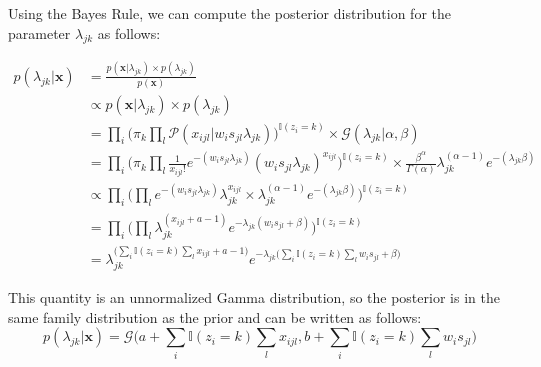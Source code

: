 Using the Bayes Rule, we can compute the posterior distribution for the parameter $\lambda_{jk}$ as follows:

\begin{equation} \label{posterior-poisson-bayes-rule-app}
  \begin{split}
  	p(\lambda_{jk} | \mathbf{x}) & = \frac{p(\mathbf{x}| \lambda_{jk}) \times p(\lambda_{jk})}{p(\mathbf{x})} \\
  		& \propto p(\mathbf{x}| \lambda_{jk}) \times p(\lambda_{jk}) \\
  		& = \prod_{i} \bigg(\pi_{k} \prod_{l} \mathcal{P}(x_{ijl} | w_{i}s_{jl} \lambda_{jk})\bigg)^{\mathbb{I}(z_{i}=k)} \times \mathcal{G}(\lambda_{jk}|\alpha, \beta) \\
  		& = \prod_{i} \bigg(\pi_{k} \prod_{l} \frac{1}{x_{ijl}!} e^{-(w_{i}s_{jl}\lambda_{jk})} (w_{i}s_{jl}\lambda_{jk})^{x_{ijl}}\bigg)^{\mathbb{I}(z_{i}=k)} \times \frac{\beta^{\alpha}}{\Gamma(\alpha)}\lambda_{jk}^{(\alpha-1)} e^{-(\lambda_{jk}\beta)} \\
		& \propto \prod_{i} \bigg(\prod_{l} e^{-(w_{i}s_{jl}\lambda_{jk})} \lambda_{jk}^{x_{ijl}} \times \lambda_{jk}^{(\alpha-1)} e^{-(\lambda_{jk}\beta)}\bigg)^{\mathbb{I}(z_{i}=k)} \\
		& = \prod_{i} \bigg(\prod_{l} \lambda_{jk}^{(x_{ijl} + a -1)} e^{-\lambda_{jk}(w_{i}s_{jl} + \beta)}\bigg)^{\mathbb{I}(z_{i}=k)} \\
		& = \lambda_{jk}^{\big(\sum\limits_{i} \mathbb{I}(z_{i}=k) \sum\limits_{l} x_{ijl} + a -1\big)} e^{-\lambda_{jk}\big(\sum\limits_{i} \mathbb{I}(z_{i}=k) \sum\limits_{l} w_{i}s_{jl} + \beta \big)}
  \end{split}
\end{equation}

This quantity is an unnormalized Gamma distribution, so the posterior is in the same family distribution as the prior and can be written as follows:
\begin{equation} \label{posterior-poisson-bayes-rule-app}
  	p(\lambda_{jk} | \mathbf{x}) = \mathcal{G}\bigg(a + \sum\limits_{i} \mathbb{I}(z_{i}=k) \sum\limits_{l} x_{ijl}, b + \sum\limits_{i} \mathbb{I}(z_{i}=k) \sum\limits_{l} w_{i}s_{jl} \bigg)
\end{equation}
 

